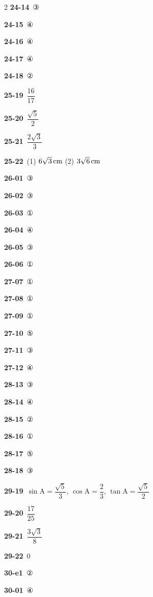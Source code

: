 \documentclass[10pt,a4paper]{article}
\newcommand{\pt}[1]{\mathrm{#1}}
\begin{document}
\begin{multicols}{2}
\noindent\textbf{24-14}\ ③\par
\noindent\textbf{24-15}\ ④\par
\noindent\textbf{24-16}\ ④\par
\noindent\textbf{24-17}\ ④\par
\noindent\textbf{24-18}\ ②\par
\noindent\textbf{25-19}\ $\dfrac{16}{17}$\par
\noindent\textbf{25-20}\ $\dfrac{\sqrt{5}}{2}$\par
\noindent\textbf{25-21}\ $\dfrac{2\sqrt{3}}{3}$\par
\noindent\textbf{25-22}\ (1) $6\sqrt{3}\mkern3mu \mathrm{cm}$ (2) $3\sqrt{6}\mkern3mu \mathrm{cm}$\par
\noindent\textbf{26-01}\ ③\par
\noindent\textbf{26-02}\ ③\par
\noindent\textbf{26-03}\ ①\par
\noindent\textbf{26-04}\ ④\par
\noindent\textbf{26-05}\ ③\par
\noindent\textbf{26-06}\ ①\par
\noindent\textbf{27-07}\ ①\par
\noindent\textbf{27-08}\ ①\par
\noindent\textbf{27-09}\ ①\par
\noindent\textbf{27-10}\ ⑤\par
\noindent\textbf{27-11}\ ③\par
\noindent\textbf{27-12}\ ④\par
\noindent\textbf{28-13}\ ③\par
\noindent\textbf{28-14}\ ④\par
\noindent\textbf{28-15}\ ②\par
\noindent\textbf{28-16}\ ①\par
\noindent\textbf{28-17}\ ⑤\par
\noindent\textbf{28-18}\ ③\par
\noindent\textbf{29-19}\ $\sin\pt{A}=\dfrac{\sqrt{5}}{3}$, $\cos\pt{A}=\dfrac{2}{3}$, $\tan\pt{A}=\dfrac{\sqrt{5}}{2}$\par
\noindent\textbf{29-20}\ $\dfrac{17}{25}$\par
\noindent\textbf{29-21}\ $\dfrac{3\sqrt{3}}{8}$\par
\noindent\textbf{29-22}\ $0$\par
\noindent\textbf{30-e1}\ ②\par
\noindent\textbf{30-01}\ ④\par

\end{multicols}
\end{document}
